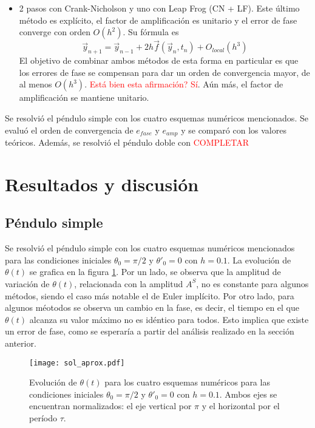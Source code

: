 \documentclass[aps,prb,twocolumn,superscriptaddress,floatfix,longbibliography]{revtex4-2}
\newif\ifptitle
\newif\ifpnumber
\newcounter{para}
\newcommand\ptitle[1]{\par\refstepcounter{para}
{\ifpnumber{\noindent\textcolor{lightgray}{\textbf{\thepara}}\indent}\fi}
{\ifptitle{\textbf{[{#1}]}}\fi}}
\begin{document}
\begin{itemize}
  \item 2 pasos con Crank-Nicholson y uno con Leap Frog (CN + LF). Este último método es explícito, el factor de amplificación es unitario y el error de fase converge con orden $O(h^2)$. Su fórmula es
  \begin{equation}
    \vec{y}_{n+1} = \vec{y}_{n-1} + 2 h \vec{f}(\vec{y}_n, t_n) + O_{local}(h^3)
    \label{eq:Leap_Frog}
  \end{equation}
  El objetivo de combinar ambos métodos de esta forma en particular es que los errores de fase se compensan para dar un orden de convergencia mayor, de al menos $O(h^3)$. \textcolor{red}{Está bien esta afirmación? Sí}. Aún más, el factor de amplificación se mantiene unitario.


\end{itemize}

\ptitle{Resumen de lo que se hará. Qué se resuelve con qué}
Se resolvió el péndulo simple con los cuatro esquemas numéricos mencionados. Se evaluó el orden de convergencia de $e_{fase}$ y $e_{amp}$ y se comparó con los valores teóricos. Además, se resolvió el péndulo doble con \textcolor{red}{COMPLETAR}


\section{Resultados y discusión}

\subsection{Péndulo simple}

Se resolvió el péndulo simple con los cuatro esquemas numéricos mencionados para las condiciones iniciales $\theta_0 = \pi/2$ y $\theta'_0 = 0$ con $h = 0.1$. La evolución de $\theta(t)$ se grafica en la figura \ref{fig:sol_aprox}. Por un lado, se observa que la amplitud de variación de $\theta(t)$, relacionada con la amplitud $A^S$, no es constante para algunos métodos, siendo el caso más notable el de Euler implícito. Por otro lado, para algunos méotodos se observa un cambio en la fase, es decir, el tiempo en el que $\theta(t)$ alcanza su valor máximo no es idéntico para todos. Esto implica que existe un error de fase, como se esperaría a partir del análisis realizado en la sección anterior.


\begin{figure}[h]
  \texttt{[image: sol\_aprox.pdf]}
  \caption{Evolución de $\theta(t)$ para los cuatro esquemas numéricos para las condiciones iniciales $\theta_0 = \pi/2$ y $\theta'_0 = 0$ con $h = 0.1$. Ambos ejes se encuentran normalizados: el eje vertical por $\pi$ y el horizontal por el período $\tau$.}
   \label{fig:sol_aprox}
\end{figure}
\end{document}
